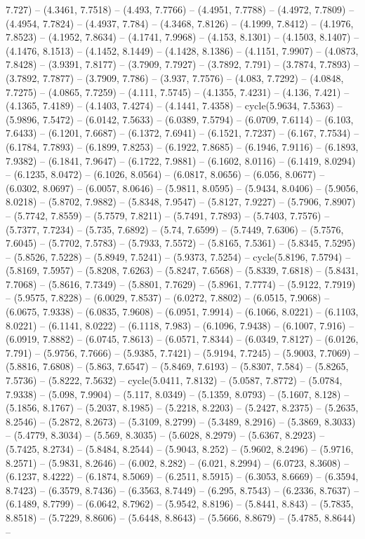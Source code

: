7.727) -- (4.3461, 7.7518) -- (4.493, 7.7766) -- (4.4951, 7.7788) -- (4.4972, 7.7809) -- (4.4954, 7.7824) -- (4.4937, 7.784) -- (4.3468, 7.8126) -- (4.1999, 7.8412) -- (4.1976, 7.8523) -- (4.1952, 7.8634) -- (4.1741, 7.9968) -- (4.153, 8.1301) -- (4.1503, 8.1407) -- (4.1476, 8.1513) -- (4.1452, 8.1449) -- (4.1428, 8.1386) -- (4.1151, 7.9907) -- (4.0873, 7.8428) -- (3.9391, 7.8177) -- (3.7909, 7.7927) -- (3.7892, 7.791) -- (3.7874, 7.7893) -- (3.7892, 7.7877) -- (3.7909, 7.786) -- (3.937, 7.7576) -- (4.083, 7.7292) -- (4.0848, 7.7275) -- (4.0865, 7.7259) -- (4.111, 7.5745) -- (4.1355, 7.4231) -- (4.136, 7.421) -- (4.1365, 7.4189) -- (4.1403, 7.4274) -- (4.1441, 7.4358) -- cycle(5.9634, 7.5363) -- (5.9896, 7.5472) -- (6.0142, 7.5633) -- (6.0389, 7.5794) -- (6.0709, 7.6114) -- (6.103, 7.6433) -- (6.1201, 7.6687) -- (6.1372, 7.6941) -- (6.1521, 7.7237) -- (6.167, 7.7534) -- (6.1784, 7.7893) -- (6.1899, 7.8253) -- (6.1922, 7.8685) -- (6.1946, 7.9116) -- (6.1893, 7.9382) -- (6.1841, 7.9647) -- (6.1722, 7.9881) -- (6.1602, 8.0116) -- (6.1419, 8.0294) -- (6.1235, 8.0472) -- (6.1026, 8.0564) -- (6.0817, 8.0656) -- (6.056, 8.0677) -- (6.0302, 8.0697) -- (6.0057, 8.0646) -- (5.9811, 8.0595) -- (5.9434, 8.0406) -- (5.9056, 8.0218) -- (5.8702, 7.9882) -- (5.8348, 7.9547) -- (5.8127, 7.9227) -- (5.7906, 7.8907) -- (5.7742, 7.8559) -- (5.7579, 7.8211) -- (5.7491, 7.7893) -- (5.7403, 7.7576) -- (5.7377, 7.7234) -- (5.735, 7.6892) -- (5.74, 7.6599) -- (5.7449, 7.6306) -- (5.7576, 7.6045) -- (5.7702, 7.5783) -- (5.7933, 7.5572) -- (5.8165, 7.5361) -- (5.8345, 7.5295) -- (5.8526, 7.5228) -- (5.8949, 7.5241) -- (5.9373, 7.5254) -- cycle(5.8196, 7.5794) -- (5.8169, 7.5957) -- (5.8208, 7.6263) -- (5.8247, 7.6568) -- (5.8339, 7.6818) -- (5.8431, 7.7068) -- (5.8616, 7.7349) -- (5.8801, 7.7629) -- (5.8961, 7.7774) -- (5.9122, 7.7919) -- (5.9575, 7.8228) -- (6.0029, 7.8537) -- (6.0272, 7.8802) -- (6.0515, 7.9068) -- (6.0675, 7.9338) -- (6.0835, 7.9608) -- (6.0951, 7.9914) -- (6.1066, 8.0221) -- (6.1103, 8.0221) -- (6.1141, 8.0222) -- (6.1118, 7.983) -- (6.1096, 7.9438) -- (6.1007, 7.916) -- (6.0919, 7.8882) -- (6.0745, 7.8613) -- (6.0571, 7.8344) -- (6.0349, 7.8127) -- (6.0126, 7.791) -- (5.9756, 7.7666) -- (5.9385, 7.7421) -- (5.9194, 7.7245) -- (5.9003, 7.7069) -- (5.8816, 7.6808) -- (5.863, 7.6547) -- (5.8469, 7.6193) -- (5.8307, 7.584) -- (5.8265, 7.5736) -- (5.8222, 7.5632) -- cycle(5.0411, 7.8132) -- (5.0587, 7.8772) -- (5.0784, 7.9338) -- (5.098, 7.9904) -- (5.117, 8.0349) -- (5.1359, 8.0793) -- (5.1607, 8.128) -- (5.1856, 8.1767) -- (5.2037, 8.1985) -- (5.2218, 8.2203) -- (5.2427, 8.2375) -- (5.2635, 8.2546) -- (5.2872, 8.2673) -- (5.3109, 8.2799) -- (5.3489, 8.2916) -- (5.3869, 8.3033) -- (5.4779, 8.3034) -- (5.569, 8.3035) -- (5.6028, 8.2979) -- (5.6367, 8.2923) -- (5.7425, 8.2734) -- (5.8484, 8.2544) -- (5.9043, 8.252) -- (5.9602, 8.2496) -- (5.9716, 8.2571) -- (5.9831, 8.2646) -- (6.002, 8.282) -- (6.021, 8.2994) -- (6.0723, 8.3608) -- (6.1237, 8.4222) -- (6.1874, 8.5069) -- (6.2511, 8.5915) -- (6.3053, 8.6669) -- (6.3594, 8.7423) -- (6.3579, 8.7436) -- (6.3563, 8.7449) -- (6.295, 8.7543) -- (6.2336, 8.7637) -- (6.1489, 8.7799) -- (6.0642, 8.7962) -- (5.9542, 8.8196) -- (5.8441, 8.843) -- (5.7835, 8.8518) -- (5.7229, 8.8606) -- (5.6448, 8.8643) -- (5.5666, 8.8679) -- (5.4785, 8.8644) -- 